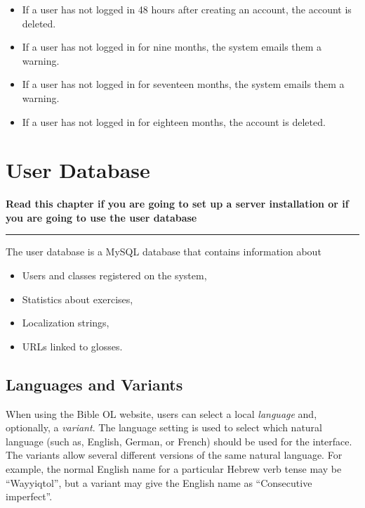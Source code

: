 \documentclass[11pt,oneside,a4paper]{memoir}
\begin{document}
\begin{itemize}
\item If a user has not logged in 48 hours after creating an account, the account is deleted.
\item If a user has not logged in for nine months, the system emails them a warning.
\item If a user has not logged in for seventeen months, the system emails them a warning.
\item If a user has not logged in for eighteen months, the account is deleted.
\end{itemize}



\chapter{User Database}\label{chap-user-database}

\textbf{Read this chapter if you are going to set up a server installation or if you are going to
  use the user database}
\plainbreak{3}

The user database is a MySQL database that contains information about

\begin{itemize}
\item Users and classes registered on the system,
\item Statistics about exercises,
\item Localization strings,
\item URLs linked to glosses.
\end{itemize}


\section{Languages and Variants}\label{sec-variants}

When using the Bible OL website, users can select a local \emph{language} and, optionally, a
\emph{variant}. The language setting is used to select which natural language (such as, English,
German, or French) should be used for the interface. The variants allow several different versions of
the same natural language. For example, the normal English name for a particular Hebrew verb
tense may be ``Wayyiqtol'', but a variant may give the English name as ``Consecutive imperfect''.
\end{document}
